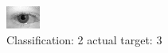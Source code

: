 \begin{figure}[h!]
\begin{center}
\includegraphics[width=0.60\columnwidth]{figures/ID546_class_2_target_3.png}
\end{center}
\caption{ Classification: 2 actual target: 3}
\label{fig:ID546_class_2_target_3}
\end{figure}
